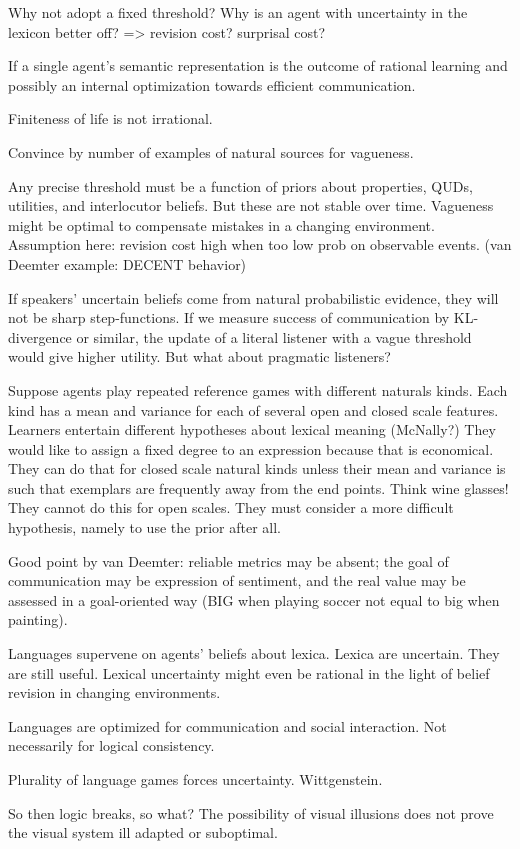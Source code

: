 \documentclass[fleqn,reqno,10pt]{article}
\begin{document}
Why not adopt a fixed threshold? Why is an agent with uncertainty in the lexicon better off? => revision cost? surprisal cost?

If a single agent's semantic representation is the outcome of rational learning and possibly an internal optimization towards efficient communication. 

Finiteness of life is not irrational. 

Convince by number of examples of natural sources for vagueness. 

Any precise threshold must be a function of priors about properties, QUDs, utilities, and interlocutor beliefs. But these are not stable over time. Vagueness might be optimal to compensate mistakes in a changing environment. Assumption here: revision cost high when too low prob on observable events. (van Deemter example: DECENT behavior)

If speakers' uncertain beliefs come from natural probabilistic evidence, they will not be sharp step-functions. If we measure success of communication by KL-divergence or similar, the update of a literal listener with a vague threshold would give higher utility. But what about pragmatic listeners?

Suppose agents play repeated reference games with different naturals kinds. Each kind has a mean and variance for each of several open and closed scale features. Learners entertain different hypotheses about lexical meaning (McNally?) They would like to assign a fixed degree to an expression because that is economical. They can do that for closed scale natural kinds unless their mean and variance is such that exemplars are frequently away from the end points. Think wine glasses! They cannot do this for open scales. They must consider a more difficult hypothesis, namely to use the prior after all. 

Good point by van Deemter: reliable metrics may be absent; the goal of communication may be expression of sentiment, and the real value may be assessed in a goal-oriented way (BIG when playing soccer not equal to big when painting).

Languages supervene on agents' beliefs about lexica. Lexica are uncertain. They are still useful. Lexical uncertainty might even be rational in the light of belief revision in changing environments. 

Languages are optimized for communication and social interaction. Not necessarily for logical consistency. 

Plurality of language games forces uncertainty. Wittgenstein. 

So then logic breaks, so what? The possibility of visual illusions does not prove the visual system ill adapted or suboptimal. 





\printbibliography[heading=bibintoc]
\end{document}
